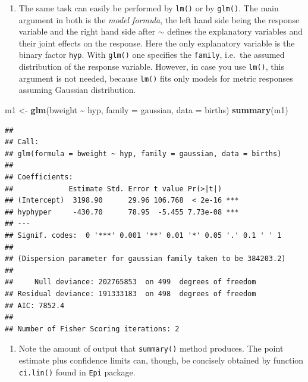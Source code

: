 \documentclass[
]{book}
\newenvironment{Shaded}{\begin{snugshade}}{\end{snugshade}}
\newcommand{\AttributeTok}[1]{\textcolor[rgb]{0.13,0.29,0.53}{#1}}
\newcommand{\FunctionTok}[1]{\textcolor[rgb]{0.13,0.29,0.53}{\textbf{#1}}}
\newcommand{\NormalTok}[1]{#1}
\newcommand{\OtherTok}[1]{\textcolor[rgb]{0.56,0.35,0.01}{#1}}
\newcommand{\SpecialCharTok}[1]{\textcolor[rgb]{0.81,0.36,0.00}{\textbf{#1}}}
\providecommand{\tightlist}{%
  \setlength{\itemsep}{0pt}\setlength{\parskip}{0pt}}
\theoremstyle{definition}
\theoremstyle{definition}
\theoremstyle{definition}
\theoremstyle{definition}
\theoremstyle{remark}
\begin{document}
\begin{enumerate}
\def\labelenumi{\arabic{enumi}.}
\setcounter{enumi}{1}
\tightlist
\item
  The same task can easily be performed by \texttt{lm()} or by \texttt{glm()}.
  The main argument in both
  is the \emph{model formula}, the left hand side being the response variable
  and the right hand side
  after \(\sim\) defines the explanatory variables and their
  joint effects on the response. Here the only
  explanatory variable is the binary factor \texttt{hyp}.
  With \texttt{glm()} one specifies the
  \texttt{family}, i.e.~the assumed distribution of the response variable.
  However, in case you use
  \texttt{lm()}, this argument is not needed, because \texttt{lm()} fits only
  models for metric responses assuming Gaussian distribution.
\end{enumerate}

\begin{Shaded}
\begin{Highlighting}[]
\NormalTok{m1 }\OtherTok{\textless{}{-}} \FunctionTok{glm}\NormalTok{(bweight }\SpecialCharTok{\textasciitilde{}}\NormalTok{ hyp, }\AttributeTok{family =}\NormalTok{ gaussian, }\AttributeTok{data =}\NormalTok{ births)}
\FunctionTok{summary}\NormalTok{(m1)}
\end{Highlighting}
\end{Shaded}

\begin{verbatim}
## 
## Call:
## glm(formula = bweight ~ hyp, family = gaussian, data = births)
## 
## Coefficients:
##             Estimate Std. Error t value Pr(>|t|)    
## (Intercept)  3198.90      29.96 106.768  < 2e-16 ***
## hyphyper     -430.70      78.95  -5.455 7.73e-08 ***
## ---
## Signif. codes:  0 '***' 0.001 '**' 0.01 '*' 0.05 '.' 0.1 ' ' 1
## 
## (Dispersion parameter for gaussian family taken to be 384203.2)
## 
##     Null deviance: 202765853  on 499  degrees of freedom
## Residual deviance: 191333183  on 498  degrees of freedom
## AIC: 7852.4
## 
## Number of Fisher Scoring iterations: 2
\end{verbatim}

\begin{enumerate}
\def\labelenumi{\arabic{enumi}.}
\setcounter{enumi}{2}
\tightlist
\item
  Note the amount of output that \texttt{summary()} method produces.
  The point estimate plus confidence limits can, though, be concisely obtained by function \texttt{ci.lin()} found in \texttt{Epi} package.
\end{enumerate}
\end{document}
